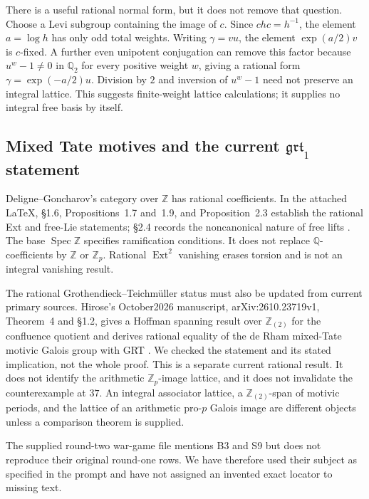 \documentclass[11pt,a4paper]{article}
\theoremstyle{definition}
\begin{document}
There is a useful rational normal form, but it does not remove that question. Choose a Levi subgroup containing the image of $c$. Since $chc=h^{-1}$, the element $a=\log h$ has only odd total weights. Writing $\gamma=vu$, the element $\exp(a/2)v$ is $c$-fixed. A further even unipotent conjugation can remove this factor because $u^w-1\neq0$ in $\mathbb Q_2$ for every positive weight $w$, giving a rational form $\gamma=\exp(-a/2)u$. Division by $2$ and inversion of $u^w-1$ need not preserve an integral lattice. This suggests finite-weight lattice calculations; it supplies no integral free basis by itself.

\subsection{Mixed Tate motives and the current \texorpdfstring{$\mathfrak{grt}_1$}{grt1} statement}

Deligne--Goncharov's category over $\mathbb Z$ has rational coefficients. In the attached LaTeX, \S1.6, Propositions~1.7 and~1.9, and Proposition~2.3 establish the rational Ext and free-Lie statements; \S2.4 records the noncanonical nature of free lifts \cite{DeligneGoncharov2005}. The base $\operatorname{Spec}\mathbb Z$ specifies ramification conditions. It does not replace $\mathbb Q$-coefficients by $\mathbb Z$ or $\mathbb Z_p$. Rational $\operatorname{Ext}^2$ vanishing erases torsion and is not an integral vanishing result.

The rational Grothendieck--Teichm\"uller status must also be updated from current primary sources. Hirose's October2026 manuscript, arXiv:2610.23719v1, Theorem~4 and \S1.2, gives a Hoffman spanning result over $\mathbb Z_{(2)}$ for the confluence quotient and derives rational equality of the de Rham mixed-Tate motivic Galois group with GRT \cite{Hirose2026}. We checked the statement and its stated implication, not the whole proof. This is a separate current rational result. It does not identify the arithmetic $\mathbb Z_p$-image lattice, and it does not invalidate the counterexample at $37$. An integral associator lattice, a $\mathbb Z_{(2)}$-span of motivic periods, and the lattice of an arithmetic pro-$p$ Galois image are different objects unless a comparison theorem is supplied.

The supplied round-two war-game file mentions B3 and S9 but does not reproduce their original round-one rows. We have therefore used their subject as specified in the prompt and have not assigned an invented exact locator to missing text.
\end{document}

